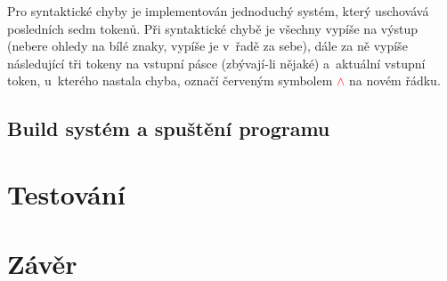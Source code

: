 Pro syntaktické chyby je implementován jednoduchý systém, který uschovává posledních sedm tokenů.
Při syntaktické chybě je všechny vypíše na výstup (nebere ohledy na bílé znaky, vypíše je v~řadě za sebe), dále za ně vypíše následující tři tokeny na vstupní pásce (zbývají-li nějaké) a~aktuální vstupní token, u~kterého nastala chyba, označí červeným symbolem \textcolor{red}{$\wedge$} na novém řádku.

\section{Build systém a spuštění programu}

\chapter{Testování}

\chapter{Závěr}